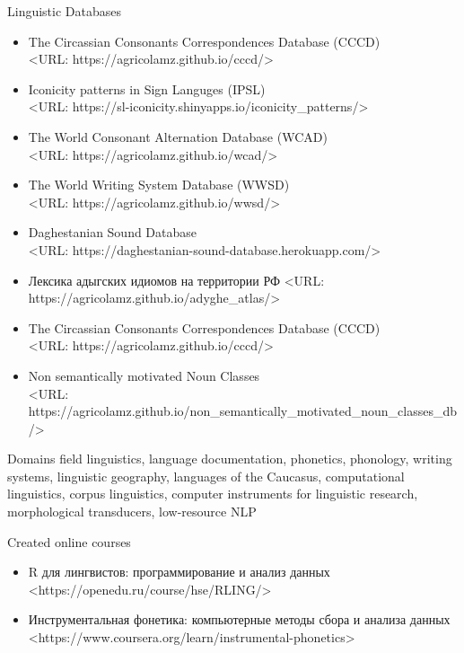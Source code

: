 \documentclass{resume} %
\begin{document}
\begin{rSection}{Linguistic Databases}
\begin{itemize}
\item The Circassian Consonants Correspondences Database (CCCD) \\ <URL: https://agricolamz.github.io/cccd/>
\item Iconicity patterns in Sign Languges (IPSL) \\ <URL: https://sl-iconicity.shinyapps.io/iconicity\_patterns/>
\item The World Consonant Alternation Database (WCAD) \\ <URL: https://agricolamz.github.io/wcad/>
\item The World Writing System Database (WWSD) \\ <URL: https://agricolamz.github.io/wwsd/>
\item Daghestanian Sound Database \\ <URL: https://daghestanian-sound-database.herokuapp.com/>
\item Лексика адыгских идиомов на территории РФ <URL: https://agricolamz.github.io/adyghe\_atlas/>
\item The Circassian Consonants Correspondences Database (CCCD) \\ <URL: https://agricolamz.github.io/cccd/>
\item Non semantically motivated Noun Classes \\ <URL: https://agricolamz.github.io/non\_semantically\_motivated\_noun\_classes\_db/> \vspace{0.6cm}
\end{itemize}
\end{rSection}

\begin{rSection}{Domains}
field linguistics, language documentation, phonetics, phonology, writing systems, linguistic geography, languages of the Caucasus, computational linguistics, corpus linguistics, computer instruments for linguistic research, morphological transducers, low-resource NLP
\end{rSection}

\begin{rSection}{Created online courses}
\begin{itemize}
\item R для лингвистов: программирование и анализ данных\\
<https://openedu.ru/course/hse/RLING/>
\item Инструментальная фонетика: компьютерные методы сбора и анализа данных\\
<https://www.coursera.org/learn/instrumental-phonetics>
\end{itemize}

\end{rSection}
\end{document}

